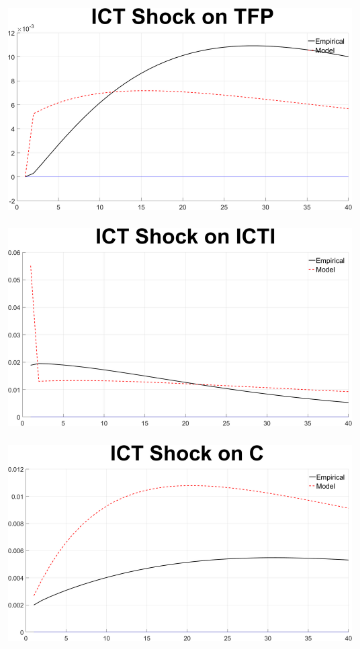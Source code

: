 \documentclass[12pt]{article}
\begin{document}
\begin{figure}[h!]
	\begin{subfigure}{.5\textwidth}
		\centering
		\includegraphics[width=1\linewidth]{MainFigures/fig_ICT_Shock_on_TFP_IRmatching_together}
	\end{subfigure}%
	\begin{subfigure}{.5\textwidth}
		\centering
		\includegraphics[width=1\linewidth]{MainFigures/fig_ICT_Shock_on_ICTI_IRmatching_together}
	\end{subfigure}
	\begin{subfigure}{.5\textwidth}
		\centering
		\includegraphics[width=1\linewidth]{MainFigures/fig_ICT_Shock_on_C_IRmatching_together}

\end{subfigure}
\end{figure}
\end{document}
